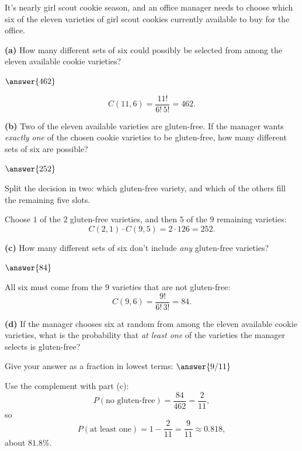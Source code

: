 \documentclass[12pt]{ximera}
\begin{document}
\begin{problem}
It's nearly girl scout cookie season, and an office manager needs to choose which six
of the eleven varieties of girl scout cookies currently available to buy for the office.

\begin{prompt}
\textbf{(a)} How many different sets of six could possibly be selected from among the
eleven available cookie varieties?

$\answer{462}$

\begin{feedback}
\[ C(11,6)=\frac{11!}{6!\,5!}=462. \]
\end{feedback}
\end{prompt}

\begin{prompt}
\textbf{(b)} Two of the eleven available varieties are gluten-free. If the manager
wants \emph{exactly one} of the chosen cookie varieties to be gluten-free, how many
different sets of six are possible?

$\answer{252}$

\begin{hint}
Split the decision in two: which gluten-free variety, and which of the others fill
the remaining five slots.
\end{hint}

\begin{feedback}
Choose $1$ of the $2$ gluten-free varieties, and then $5$ of the $9$ remaining
varieties:
\[
C(2,1)\cdot C(9,5) = 2\cdot 126 = 252.
\]
\end{feedback}
\end{prompt}

\begin{prompt}
\textbf{(c)} How many different sets of six don't include \emph{any} gluten-free
varieties?

$\answer{84}$

\begin{feedback}
All six must come from the $9$ varieties that are not gluten-free:
\[ C(9,6)=\frac{9!}{6!\,3!}=84. \]
\end{feedback}
\end{prompt}

\begin{prompt}
\textbf{(d)} If the manager chooses six at random from among the eleven available cookie
varieties, what is the probability that \emph{at least one} of the varieties the manager selects
is gluten-free?

Give your answer as a fraction in lowest terms: $\answer{9/11}$

\begin{feedback}
Use the complement with part (c):
\[
P(\text{no gluten-free}) = \frac{84}{462} = \frac{2}{11},
\]
so
\[
P(\text{at least one}) = 1-\frac{2}{11} = \frac{9}{11}\approx 0.818,
\]
about $81.8\%$.
\end{feedback}
\end{prompt}
\end{problem}
\end{document}
